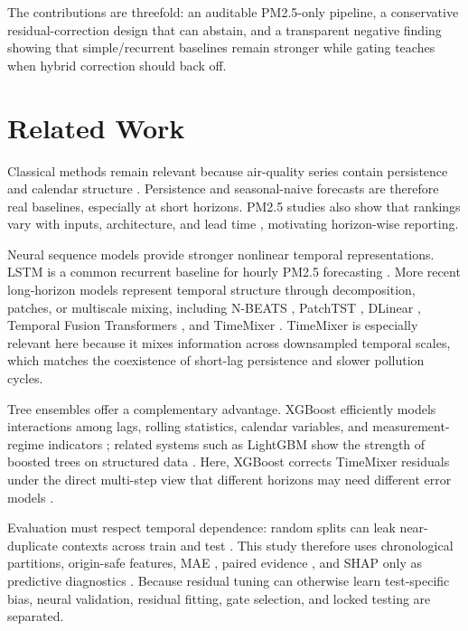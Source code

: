 \documentclass[sn-mathphys-num]{sn-jnl}
\begin{document}
The contributions are threefold: an auditable PM2.5-only pipeline, a
conservative residual-correction design that can abstain, and a transparent
negative finding showing that simple/recurrent baselines remain stronger while
gating teaches when hybrid correction should back off.

\section{Related Work}
\label{sec:related}

Classical methods remain relevant because air-quality series contain
persistence and calendar structure \cite{hyndman2021fpp3}. Persistence and
seasonal-naive forecasts are therefore real baselines, especially at short
horizons. PM2.5 studies also show that rankings vary with inputs, architecture,
and lead time \cite{beijing2021forecast}, motivating horizon-wise reporting.

Neural sequence models provide stronger nonlinear temporal representations.
LSTM is a common recurrent baseline for hourly PM2.5 forecasting
\cite{hochreiter1997lstm,bai2019ensemble}. More recent long-horizon models
represent temporal structure through decomposition, patches, or multiscale
mixing, including N-BEATS \cite{oreshkin2020nbeats}, PatchTST
\cite{nie2023patchtst}, DLinear \cite{zeng2023dlinear}, Temporal Fusion
Transformers \cite{lim2021temporal}, and TimeMixer
\cite{wang2024timemixer}. TimeMixer is especially relevant here because it
mixes information across downsampled temporal scales, which matches the
coexistence of short-lag persistence and slower pollution cycles.

Tree ensembles offer a complementary advantage. XGBoost efficiently models
interactions among lags, rolling statistics, calendar variables, and
measurement-regime indicators \cite{chen2016xgboost}; related systems such as
LightGBM show the strength of boosted trees on structured data
\cite{ke2017lightgbm}. Here, XGBoost corrects TimeMixer residuals under the
direct multi-step view that different horizons may need different error models
\cite{taieb2012review}.

Evaluation must respect temporal dependence: random splits can leak
near-duplicate contexts across train and test \cite{bergmeir2018cv}. This study
therefore uses chronological partitions, origin-safe features, MAE
\cite{willmott2005mae}, paired evidence \cite{diebold1995accuracy,newey1987hac},
and SHAP only as predictive diagnostics \cite{lundberg2017shap}. Because
residual tuning can otherwise learn test-specific bias, neural validation,
residual fitting, gate selection, and locked testing are separated.
\end{document}
